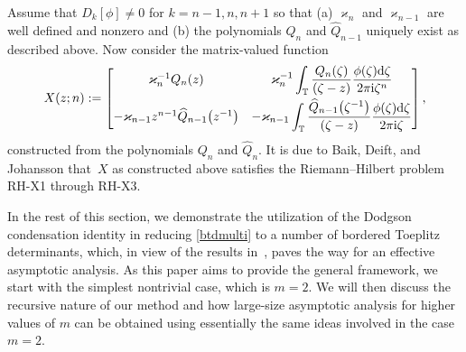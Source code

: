 \documentclass[10pt,a4paper]{amsart}
\numberwithin{equation}{section}
\newcommand{\T}{{\mathbb T}}
\newcommand{\ze}{\zeta}
\newcommand{\ii}{{\rm i}}
\newcommand{\dd}{{\rm d}}
\begin{document}
	
	
	Assume that $D_k[\phi] \neq 0$ for $k=n-1, n, n+1$ so that (a) $\varkappa_n$ and $\varkappa_{n-1}$ are well defined and nonzero and (b) the polynomials $Q_n$ and $\widehat{Q}_{n-1}$ uniquely exist as described above. Now consider the matrix-valued function
	\begin{equation}\label{Toeplitz-OP-solution}
		X(z;n):=\begin{bmatrix}
			\varkappa_n^{-1} Q_n(z) & \displaystyle \varkappa^{-1}_n \int_{\T} \frac{Q_n(\ze)}{(\ze-z)} \frac{\phi(\ze)\dd \ze}{2\pi \ii \ze^n} \vspace{1mm}\\
			-\varkappa_{n-1}z^{n-1}\widehat{Q}_{n-1}\big(z^{-1}\big) & \displaystyle -\varkappa_{n-1} \int_{\T} \frac{\widehat{Q}_{n-1}\big(\ze^{-1}\big)}{(\ze-z)} \frac{\phi(\ze)\dd \ze}{2\pi \ii \ze}
		\end{bmatrix},
	\end{equation}
	constructed from the polynomials $Q_n$ and $\widehat{Q}_n$. It is due to Baik, Deift, and Johansson \cite{BDJ} that~$X$ as constructed above satisfies the Riemann--Hilbert problem {\rm RH-X1} through {\rm RH-X3}.
	
In the rest of this section, we demonstrate the utilization of the Dodgson condensation identity in reducing \eqref{btdmulti} to a number of bordered Toeplitz determinants, which, in view of the results in~\cite{BEGIL}, paves the way for an effective asymptotic analysis. As this paper aims to provide the general framework, we start with the simplest nontrivial case, which is $m=2$. We will then discuss the recursive nature of our method and how large-size asymptotic analysis for higher values of $m$ can be obtained using essentially the same ideas involved in the case $m=2$.
	
\end{document}

